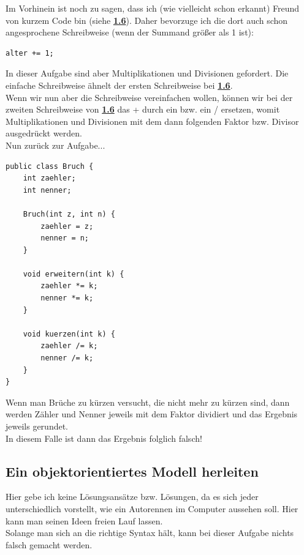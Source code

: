 \documentclass{scrartcl}   %
\begin{document}
Im Vorhinein ist noch zu sagen, dass ich (wie vielleicht schon erkannt) Freund von kurzem Code bin (siehe \hyperlink{subsection.1.6}{\textbf{1.6}}). Daher bevorzuge ich die dort auch schon angesprochene Schreibweise (wenn der Summand größer als 1 ist):\\
\begin{lstlisting}
alter += 1;
\end{lstlisting}

In dieser Aufgabe sind aber Multiplikationen und Divisionen gefordert. Die einfache Schreibweise ähnelt der ersten Schreibweise bei \hyperlink{subsection.1.6}{\textbf{1.6}}.\\
Wenn wir nun aber die Schreibweise vereinfachen wollen, können wir bei der zweiten Schreibweise von \hyperlink{subsection.1.6}{\textbf{1.6}} das \glqq +\grqq{} durch ein \glqq *\grqq{} bzw. ein \glqq/\grqq{} ersetzen, womit Multiplikationen und Divisionen mit dem dann folgenden Faktor bzw. Divisor ausgedrückt werden.\\

Nun zurück zur Aufgabe...

\newpage

\begin{lstlisting}
public class Bruch {
    int zaehler;
    int nenner;
    
    Bruch(int z, int n) {
        zaehler = z;
        nenner = n;
    }
    
    void erweitern(int k) {
        zaehler *= k;
        nenner *= k;
    }
    
    void kuerzen(int k) {
        zaehler /= k;
        nenner /= k;
    }
}
\end{lstlisting}

Wenn man Brüche zu kürzen versucht, die nicht mehr zu kürzen sind, dann werden Zähler und Nenner jeweils mit dem Faktor dividiert und das Ergebnis jeweils gerundet.\\
In diesem Falle ist dann das Ergebnis folglich falsch!

\subsection{Ein objektorientiertes Modell herleiten}

Hier gebe ich keine Lösungsansätze bzw. Lösungen, da es sich jeder unterschiedlich vorstellt, wie ein Autorennen im Computer aussehen soll. Hier kann man seinen Ideen freien Lauf lassen.\\
Solange man sich an die richtige Syntax hält, kann bei dieser Aufgabe nichts falsch gemacht werden.
\end{document}
